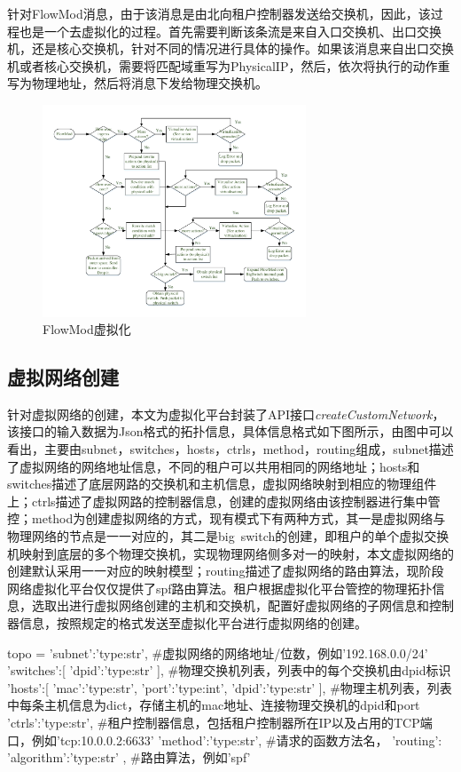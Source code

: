 针对FlowMod消息，由于该消息是由北向租户控制器发送给交换机，因此，该过程也是一个去虚拟化的过程。首先需要判断该条流是来自入口交换机、出口交换机，还是核心交换机，针对不同的情况进行具体的操作。如果该消息来自出口交换机或者核心交换机，需要将匹配域重写为PhysicalIP，然后，依次将执行的动作重写为物理地址，然后将消息下发给物理交换机。

\begin{figure}[!htb]
  \centering
  \includegraphics[width=0.7\textwidth]{logo/FlowMod}
  \caption{FlowMod虚拟化}
  \label{fig:flowmod}
\end{figure}
\subsection{虚拟网络创建}
针对虚拟网络的创建，本文为虚拟化平台封装了API接口\emph{createCustomNetwork}，该接口的输入数据为Json格式的拓扑信息，具体信息格式如下图所示，由图中可以看出，主要由subnet，switches，hosts，ctrls，method，routing组成，subnet描述了虚拟网络的网络地址信息，不同的租户可以共用相同的网络地址；hosts和switches描述了底层网路的交换机和主机信息，虚拟网络映射到相应的物理组件上；ctrls描述了虚拟网路的控制器信息，创建的虚拟网络由该控制器进行集中管控；method为创建虚拟网络的方式，现有模式下有两种方式，其一是虚拟网络与物理网络的节点是一一对应的，其二是big\ switch的创建，即租户的单个虚拟交换机映射到底层的多个物理交换机，实现物理网络侧多对一的映射，本文虚拟网络的创建默认采用一一对应的映射模型；routing描述了虚拟网络的路由算法，现阶段网络虚拟化平台仅仅提供了spf路由算法。租户根据虚拟化平台管控的物理拓扑信息，选取出进行虚拟网络创建的主机和交换机，配置好虚拟网络的子网信息和控制器信息，按照规定的格式发送至虚拟化平台进行虚拟网络的创建。

\begin{python} 
topo = {
	'subnet':'type:str', #虚拟网络的网络地址/位数，例如'192.168.0.0/24'
	'switches':[
		{
			'dpid':'type:str'
		}
	], #物理交换机列表，列表中的每个交换机由dpid标识
	'hosts':[
		{
			'mac':'type:str',
			'port':'type:int',
			'dpid':'type:str'
		}
	], #物理主机列表，列表中每条主机信息为dict，存储主机的mac地址、连接物理交换机的dpid和port
	'ctrls':'type:str', #租户控制器信息，包括租户控制器所在IP以及占用的TCP端口，例如'tcp:10.0.0.2:6633'
	'method':'type:str', #请求的函数方法名，
	'routing':{
		'algorithm':'type:str'
	}, #路由算法，例如'spf'
}
\end{python}

